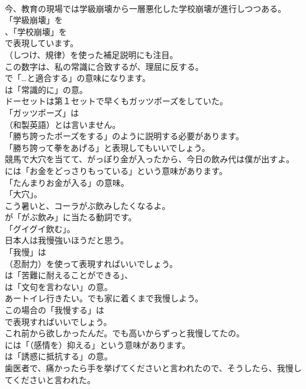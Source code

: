 \documentclass[8pt]{extreport}
\begin{document}
\begin{CJK}{UTF8}{min}
\\	今、教育の現場では学級崩壊から一層悪化した学校崩壊が進行しつつある。 
\\	「学級崩壊」を
\\	、「学校崩壊」を
\\	で表現しています。
\\	（しつけ、規律）を使った補足説明にも注目。	
\\	この数字は、私の常識に合致するが、理屈に反する。 
\\	で「…と適合する」の意味になります。
\\	は「常識的に」の意。	
\\	ドーセットは第１セットで早くもガッツポーズをしていた。 
\\	「ガッツポーズ」は
\\	（和製英語）とは言いません。
\\	「勝ち誇ったポーズをする」のように説明する必要があります。
\\	「勝ち誇って拳をあげる」と表現してもいいでしょう。	
\\	競馬で大穴を当てて、がっぽり金が入ったから、今日の飲み代は僕が出すよ。 
\\	には「お金をどっさりもっている」という意味があります。
\\	「たんまりお金が入る」の意味。
\\	「大穴」。	
\\	こう暑いと、コーラがぶ飲みしたくなるよ。 
\\	が「がぶ飲み」に当たる動詞です。
\\	「グイグイ飲む」。	
\\	日本人は我慢強いほうだと思う。 
\\	「我慢」は
\\	（忍耐力）を使って表現すればいいでしょう。
\\	は「苦難に耐えることができる」、
\\	は「文句を言わない」の意。	
\\	あートイレ行きたい。でも家に着くまで我慢しよう。 
\\	この場合の「我慢する」は 
\\	で表現すればいいでしょう。	
\\	これ前から欲しかったんだ。でも高いからずっと我慢してたの。 
\\	には「（感情を）抑える」という意味があります。
\\	は「誘惑に抵抗する」の意。	
\\	歯医者で、痛かったら手を挙げてくださいと言われたので、そうしたら、我慢してくださいと言われた。 

\end{CJK}
\end{document}
